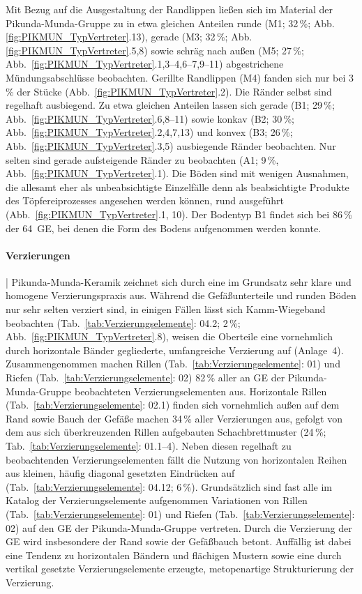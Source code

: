 Mit Bezug auf die Ausgestaltung der Randlippen ließen sich im Material der Pikunda-Munda-Gruppe zu in etwa gleichen Anteilen runde (M1; 32\,\%; Abb. \ref{fig:PIKMUN_TypVertreter}.13), gerade (M3; 32\,\%; Abb. \ref{fig:PIKMUN_TypVertreter}.5,8) sowie schräg nach außen (M5; 27\,\%; Abb.~\ref{fig:PIKMUN_TypVertreter}.1,3--4,6--7,9--11) abgestrichene Mündungsabschlüsse beobachten. Gerillte Randlippen (M4) fanden sich nur bei 3\,\% der Stücke (Abb.~\ref{fig:PIKMUN_TypVertreter}.2). Die Ränder selbst sind regelhaft ausbiegend. Zu etwa gleichen Anteilen lassen sich gerade (B1; 29\,\%; Abb.~\ref{fig:PIKMUN_TypVertreter}.6,8--11) sowie konkav (B2; 30\,\%; Abb.~\ref{fig:PIKMUN_TypVertreter}.2,4,7,13) und konvex (B3; 26\,\%; Abb.~\ref{fig:PIKMUN_TypVertreter}.3,5) ausbiegende Ränder beobachten. Nur selten sind gerade aufsteigende Ränder zu beobachten (A1; 9\,\%, Abb.~\ref{fig:PIKMUN_TypVertreter}.1). Die Böden sind mit wenigen Ausnahmen, die allesamt eher als unbeabsichtigte Einzelfälle denn als beabsichtigte Produkte des Töpfereiprozesses angesehen werden können, rund ausgeführt (Abb.~\ref{fig:PIKMUN_TypVertreter}.1, 10). Der Bodentyp B1 findet sich bei 86\,\% der 64~GE, bei denen die Form des Bodens aufgenommen werden konnte.

\paragraph{Verzierungen}\hspace{-.5em}|\hspace{.5em}%
Pikunda-Munda-Keramik zeichnet sich durch eine im Grundsatz sehr klare und homogene Verzierungspraxis aus. Während die Gefäßunterteile und runden Böden nur sehr selten verziert sind, in einigen Fällen lässt sich Kamm-Wiegeband beobachten (Tab.~\ref{tab:Verzierungselemente}: 04.2; 2\,\%; Abb.~\ref{fig:PIKMUN_TypVertreter}.8), weisen die Oberteile eine vornehmlich durch horizontale Bänder gegliederte, umfangreiche Verzierung auf (Anlage~4). Zusammengenommen machen Rillen (Tab.~\ref{tab:Verzierungselemente}: 01) und Riefen (Tab.~\ref{tab:Verzierungselemente}: 02) 82\,\% aller an GE der Pikunda-Munda-Gruppe beobachteten Verzierungselementen aus. Horizontale Rillen (Tab.~\ref{tab:Verzierungselemente}: 02.1) finden sich vornehmlich außen auf dem Rand sowie Bauch der Gefäße machen 34\,\% aller Verzierungen aus, gefolgt von dem aus sich überkreuzenden Rillen aufgebauten Schachbrettmuster (24\,\%; Tab.~\ref{tab:Verzierungselemente}: 01.1--4). Neben diesen regelhaft zu beobachtenden Verzierungselementen fällt die Nutzung von horizontalen Reihen aus kleinen, häufig diagonal gesetzten Eindrücken auf (Tab.~\ref{tab:Verzierungselemente}: 04.12; 6\,\%). Grundsätzlich sind fast alle im Katalog der Verzierungselemente aufgenommen Variationen von Rillen (Tab.~\ref{tab:Verzierungselemente}: 01) und Riefen (Tab.~\ref{tab:Verzierungselemente}: 02) auf den GE der Pikunda-Munda-Gruppe vertreten. Durch die Verzierung der GE wird insbesondere der Rand sowie der Gefäßbauch betont. Auffällig ist dabei eine Tendenz zu horizontalen Bändern und flächigen Mustern sowie eine durch vertikal gesetzte Verzierungselemente erzeugte, metopenartige Strukturierung der Verzierung. 

